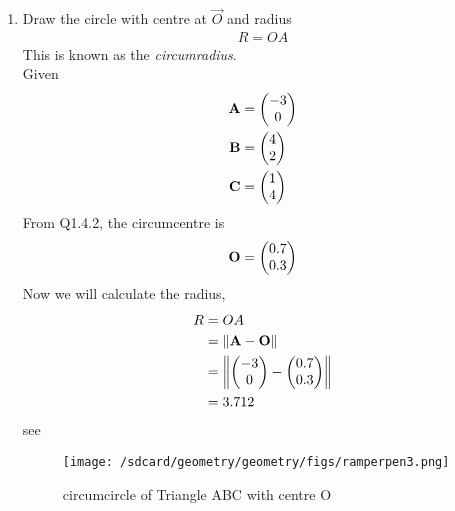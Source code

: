 \documentclass[11pt]{book}
\begin{document}
\begin{enumerate}[label=\thesection.\arabic*.,ref=\thesection.\theenumi]
\item Draw the circle with centre at $\vec{O}$ and radius 
\begin{align}
R = OA
\end{align}
This is known as the {\em circumradius}. \\
\solution
Given
\begin{align}
\mathbf{A} &= \begin{pmatrix}-3\\0\end{pmatrix}\\
\mathbf{B} &= \begin{pmatrix}4\\2\end{pmatrix}\\
\mathbf{C} &= \begin{pmatrix}1\\4\end{pmatrix}
\end{align}
From Q1.4.2, the circumcentre is
\begin{align}
\mathbf{O} = \begin{pmatrix}0.7\\ 0.3\end{pmatrix}
\end{align}
Now we will calculate the radius,
\begin{align}
      R &= OA\\
        &= \left\lVert\mathbf{A} - \mathbf{O}\right\rVert\\
        &= \left\lVert\begin{pmatrix}-3\\0\end{pmatrix} - \begin{pmatrix}0.7\\ 0.3\end{pmatrix}\right\rVert\\
        &= 3.712
\end{align}
see 
\begin{figure}[H]
\centering
\texttt{[image: /sdcard/geometry/geometry/figs/ramperpen3.png]}
\caption{circumcircle of Triangle ABC with centre O}
\label{fig:circumcircle with centre O}	
\end{figure}


\end{enumerate}
\end{document}

